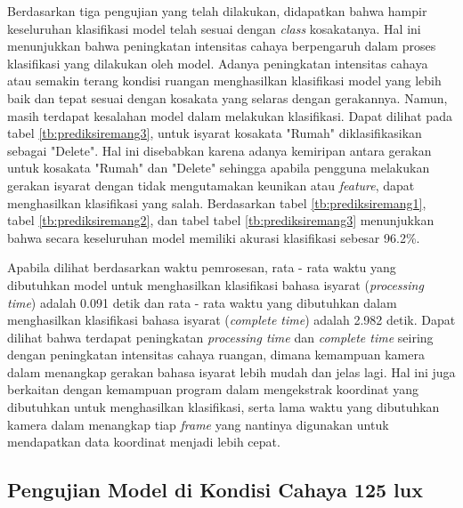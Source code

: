 Berdasarkan tiga pengujian yang telah dilakukan, didapatkan bahwa hampir keseluruhan klasifikasi model telah sesuai dengan \emph{class} kosakatanya. Hal ini menunjukkan bahwa peningkatan intensitas cahaya berpengaruh dalam proses klasifikasi yang dilakukan oleh model. Adanya peningkatan intensitas cahaya atau semakin terang kondisi ruangan menghasilkan klasifikasi model yang lebih baik dan tepat sesuai dengan kosakata yang selaras dengan gerakannya. Namun, masih terdapat kesalahan model dalam melakukan klasifikasi. Dapat dilihat pada tabel \ref{tb:prediksiremang3}, untuk isyarat kosakata "Rumah" diklasifikasikan sebagai "Delete". Hal ini disebabkan karena adanya kemiripan antara gerakan untuk kosakata "Rumah" dan "Delete" sehingga apabila pengguna melakukan gerakan isyarat dengan tidak mengutamakan keunikan atau \emph{feature}, dapat menghasilkan klasifikasi yang salah. Berdasarkan tabel \ref{tb:prediksiremang1}, tabel \ref{tb:prediksiremang2}, dan tabel tabel \ref{tb:prediksiremang3} menunjukkan bahwa secara keseluruhan model memiliki akurasi klasifikasi sebesar 96.2\%.

Apabila dilihat berdasarkan waktu pemrosesan, rata - rata waktu yang dibutuhkan model untuk menghasilkan klasifikasi bahasa isyarat (\emph{processing time}) adalah 0.091 detik dan rata - rata waktu yang dibutuhkan dalam menghasilkan klasifikasi bahasa isyarat (\emph{complete time}) adalah 2.982  detik. Dapat dilihat bahwa terdapat peningkatan \emph{processing time} dan \emph{complete time} seiring dengan peningkatan intensitas cahaya ruangan, dimana kemampuan kamera dalam menangkap gerakan bahasa isyarat lebih mudah dan jelas lagi. Hal ini juga berkaitan dengan kemampuan program dalam mengekstrak koordinat yang dibutuhkan untuk menghasilkan klasifikasi, serta lama waktu yang dibutuhkan kamera dalam menangkap tiap \emph{frame} yang nantinya digunakan untuk mendapatkan data koordinat menjadi lebih cepat.

\subsection{Pengujian Model di Kondisi Cahaya 125 lux}
\label{sec:analisiscahaya3}

